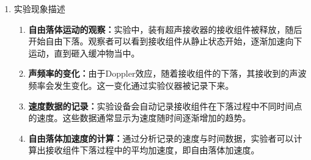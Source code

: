 \documentclass[dvipsnames, svgnames,a4paper,11pt]{article}
\begin{document}
\begin{enumerate}
		\item 实验现象描述
		\begin{enumerate}
			\item \textbf{自由落体运动的观察：}实验中，装有超声接收器的接收组件被释放，随后开始自由下落。观察者可以看到接收组件从静止状态开始，逐渐加速向下运动，直到砸入缓冲物当中。
			
			\item \textbf{声频率的变化：}由于Doppler效应，随着接收组件的下落，其接收到的声波频率会发生变化。这一变化通过实验仪器被记录下来。
			
			\item \textbf{速度数据的记录：}实验设备会自动记录接收组件在下落过程中不同时间点的速度。这些数据通常显示为速度随时间逐渐增加的趋势。
			
			\item \textbf{自由落体加速度的计算：}通过分析记录的速度与时间数据，实验者可以计算出接收组件下落过程中的平均加速度，即自由落体加速度。
			
		\end{enumerate}
	\end{enumerate}
	
\end{document}
